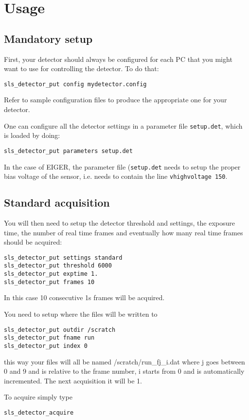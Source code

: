 \documentclass{article}
\newcommand{\E}{EIGER\xspace}
\begin{document}
\section{Usage}

\subsection{Mandatory setup}
First, your detector should always be configured for each PC that you might want to use for controlling the detector.
To do that:
\begin{verbatim}
sls_detector_put config mydetector.config
\end{verbatim}
Refer to sample configuration files to produce the appropriate one for your detector.

One can configure all the detector settings in a parameter file {\tt{setup.det}}, which is loaded by doing:
\begin{verbatim}
sls_detector_put parameters setup.det
\end{verbatim}

In the case of \E, the parameter file ({\tt{setup.det}} needs to setup the proper bias voltage of the sensor, i.e. needs to contain the line {\tt{vhighvoltage 150}}.

\subsection{Standard acquisition}

You will then need to setup the detector threshold and settings, the exposure time, the number of real time frames and eventually how many real time frames should be acquired:
\begin{verbatim}
sls_detector_put settings standard
sls_detector_put threshold 6000
sls_detector_put exptime 1.
sls_detector_put frames 10
\end{verbatim}
In this case 10 consecutive 1s frames will be acquired.

You need to setup where the files will be written to
\begin{verbatim}
sls_detector_put outdir /scratch
sls_detector_put fname run
sls_detector_put index 0
\end{verbatim}
this way your files will all be named /scratch/run\_fj\_i.dat where j goes between 0 and 9 and is relative to the frame number, i starts from 0 and is automatically incremented. The next acquisition it will be 1.


To acquire simply type
\begin{verbatim}
sls_detector_acquire
\end{verbatim}
\end{document}
